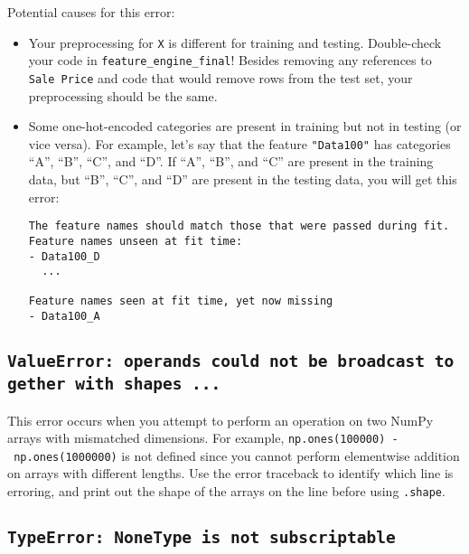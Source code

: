 \documentclass[
  letterpaper,
  DIV=11,
  numbers=noendperiod]{scrreprt}
\begin{document}
Potential causes for this error:

\begin{itemize}
\item
  Your preprocessing for \texttt{X} is different for training and
  testing. Double-check your code in \texttt{feature\_engine\_final}!
  Besides removing any references to
  \texttt{\textquotesingle{}Sale\ Price\textquotesingle{}} and code that
  would remove rows from the test set, your preprocessing should be the
  same.
\item
  Some one-hot-encoded categories are present in training but not in
  testing (or vice versa). For example, let's say that the feature
  \texttt{"Data100"} has categories ``A'', ``B'', ``C'', and ``D''. If
  ``A'', ``B'', and ``C'' are present in the training data, but ``B'',
  ``C'', and ``D'' are present in the testing data, you will get this
  error:

\begin{verbatim}
The feature names should match those that were passed during fit. Feature names unseen at fit time: 
- Data100_D
  ...

Feature names seen at fit time, yet now missing
- Data100_A
\end{verbatim}
\end{itemize}

\subsection{\texorpdfstring{\texttt{ValueError:\ operands\ could\ not\ be\ broadcast\ together\ with\ shapes\ ...}}{ValueError: operands could not be broadcast together with shapes ...}}\label{valueerror-operands-could-not-be-broadcast-together-with-shapes-...}

This error occurs when you attempt to perform an operation on two NumPy
arrays with mismatched dimensions. For example,
\texttt{np.ones(100000)\ -\ np.ones(1000000)} is not defined since you
cannot perform elementwise addition on arrays with different lengths.
Use the error traceback to identify which line is erroring, and print
out the shape of the arrays on the line before using \texttt{.shape}.

\subsection{\texorpdfstring{\texttt{TypeError:\ NoneType\ is\ not\ subscriptable}}{TypeError: NoneType is not subscriptable}}\label{typeerror-nonetype-is-not-subscriptable}
\end{document}
